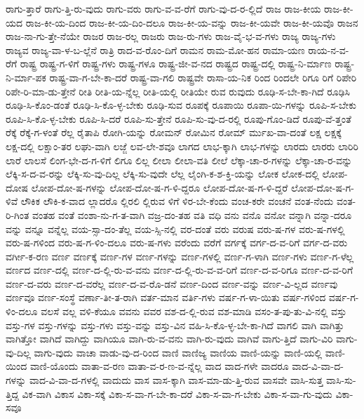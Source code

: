 {ರಾಗು-ತ್ತಾರೆ
ರಾಗು-ತ್ತಿ-ರು-ವುದು
ರಾಗು-ವರು
ರಾಗು-ವ-ವ-ರೆಗೆ
ರಾಗು-ವು-ದ-ರ-ಲ್ಲಿದೆ
ರಾಜ
ರಾಜ-ಕೀಯ
ರಾಜ-ಕೀ-ಯದ
ರಾಜ-ಕೀ-ಯ-ದಿಂದ
ರಾಜ-ಕೀ-ಯ-ದಿಂ-ದಲೂ
ರಾಜ-ಕೀ-ಯ-ವನ್ನು
ರಾಜ-ಕೀ-ಯವೇ
ರಾಜ-ಕೀ-ಯವೊ
ರಾಜನ
ರಾಜ-ನಾ-ಗು-ತ್ತೇ-ನೆಯೇ
ರಾಜರ
ರಾಜ-ರಲ್ಲ
ರಾಜರು
ರಾಜ-ರು-ಗಳು
ರಾಜ-ವೈ-ಭ-ವ-ಗಳು
ರಾಜ್ಯ
ರಾಜ್ಯ-ಗಳು
ರಾಜ್ಯವ
ರಾಜ್ಯ-ವಾ-ಳ-ಬ-ಲ್ಲೆನೆ
ರಾತ್ರಿ
ರಾದ-ವ-ರೊಂ-ದಿಗೆ
ರಾಮನ
ರಾಮ-ಮೋ-ಹನ
ರಾಮಾ-ಯಣ
ರಾಯ-ನ-ವ-ರೆಗೆ
ರಾಷ್ಟ್ರ
ರಾಷ್ಟ್ರ-ಗ-ಳಿಗೆ
ರಾಷ್ಟ್ರ-ಗಳು
ರಾಷ್ಟ್ರ-ಗಳೂ
ರಾಷ್ಟ್ರ-ಜೀ-ವ-ನದ
ರಾಷ್ಟ್ರದ
ರಾಷ್ಟ್ರ-ದಲ್ಲಿ
ರಾಷ್ಟ್ರ-ನಿ-ರ್ಮಾಣ
ರಾಷ್ಟ್ರ-ನಿ-ರ್ಮಾ-ಪಕ
ರಾಷ್ಟ್ರ-ವಾ-ಗ-ಬೇ-ಕಾ-ದರೆ
ರಾಷ್ಟ್ರ-ವಾ-ಗಲಿ
ರಾಷ್ಟ್ರವೇ
ರಾಸಾ-ಯ-ನಿಕ
ರಿಂದ
ರಿಂದಲೇ
ರಿಗೂ
ರಿಗೆ
ರಿಪೇರಿ
ರಿಪೇ-ರಿ-ಮಾ-ಡು-ತ್ತೇನೆ
ರೀತಿ
ರೀತಿ-ಯ-ನ್ನೆಲ್ಲ
ರೀತಿ-ಯಲ್ಲಿ
ರೀತಿಯೇ
ರುವ
ರುವುದು
ರೂಢಿ-ಸ-ಬೇ-ಕಾ-ಗಿದೆ
ರೂಢಿಸಿ
ರೂಢಿ-ಸಿ-ಕೊಂ-ಡಂತೆ
ರೂಢಿ-ಸಿ-ಕೊ-ಳ್ಳ-ಬೇಕು
ರೂಢಿ-ಸುವ
ರೂಪಕ್ಕೆ
ರೂಪಾಯಿ
ರೂಪಾ-ಯಿ-ಗಳನ್ನು
ರೂಪಿ-ಸ-ಬೇಕು
ರೂಪಿ-ಸಿ-ಕೊ-ಳ್ಳ-ಬೇಕು
ರೂಪಿ-ಸಿ-ದರೆ
ರೂಪಿ-ಸು-ತ್ತೇನೆ
ರೂಪಿ-ಸು-ವು-ದ-ರಲ್ಲಿ
ರೂಪು-ಗೊಂ-ಡಿದೆ
ರೂಪು-ವೆ-ತ್ತಂತೆ
ರೆಕ್ಕೆ
ರೆಕ್ಕೆ-ಗ-ಳಂತೆ
ರೆಲ್ಲ
ರೈತಾಪಿ
ರೋಗಿ-ಯನ್ನು
ರೋಮನ್
ರೋಮಿನ
ರೋಮ್
ರ್ಮುಖ-ವಾ-ದಂತೆ
ಲಕ್ಷ
ಲಕ್ಷಕ್ಕೆ
ಲಕ್ಷ-ದಲ್ಲಿ
ಲಕ್ಷಾಂ-ತರ
ಲಘು-ವಾಗಿ
ಲಜ್ಜೆ
ಲವ-ಲೇ-ಶವೂ
ಲಾಗದ
ಲಾಭ-ಕ್ಕಾಗಿ
ಲಾಭ-ಗಳನ್ನು
ಲಾರದು
ಲಾರರು
ಲಾರಿರಿ
ಲಾರೆ
ಲಾಲಸೆ
ಲಿಂಗ-ಭೇ-ದ-ಗ-ಳಿಗೆ
ಲಿಗೂ
ಲಿಲ್ಲ
ಲೀಲಾ
ಲೀಲಾ-ವತಿ
ಲೀಲೆ
ಲೆಕ್ಕಾ-ಚಾ-ರ-ಗಳನ್ನು
ಲೆಕ್ಕಾ-ಚಾ-ರ-ವನ್ನು
ಲೆಕ್ಕಿ-ಸ-ದ-ವ-ರನ್ನು
ಲೆಕ್ಕಿ-ಸು-ವು-ದಿಲ್ಲ
ಲೆಕ್ಕಿ-ಸು-ವುದೇ
ಲೆಲ್ಲ
ಲೈಂಗಿ-ಕ-ಶ-ಕ್ತಿ-ಯನ್ನು
ಲೋಕ
ಲೋಕ-ದಲ್ಲಿ
ಲೋಪ-ದೋಷ
ಲೋಪ-ದೋ-ಷ-ಗಳನ್ನು
ಲೋಪ-ದೋ-ಷ-ಗ-ಳಿ-ದ್ದರೂ
ಲೋಪ-ದೋ-ಷ-ಗ-ಳಿ-ದ್ದರೆ
ಲೋಪ-ದೋ-ಷ-ಗ-ಳಿವೆ
ಲೌಕಿಕ
ಲೌಕಿ-ಕ-ವಾದ
ಲ್ಲಾದರೊ
ಲ್ಲಿರಲಿ
ಲ್ಲಿರುವ
ಳಿಗೆ
ಳಿರ-ಬೇ-ಕೆಂದು
ವಂಚ-ಕರೇ
ವಂಚನೆ
ವಂತ-ನೆಂದು
ವಂತ-ರಿ-ಗಿಂತ
ವಂತಹ
ವಂತೆ
ವಂಶಾ-ನು-ಗ-ತ-ವಾಗಿ
ವಜ್ರ-ದಂ-ತಹ
ವತಿ
ವಧಿ
ವನು
ವನೊ
ವನೋ
ವನ್ನಾಗಿ
ವನ್ನಾ-ದರೂ
ವನ್ನು
ವನ್ನೂ
ವನ್ನೆಲ್ಲ
ವಯ-ಸ್ಸಾ-ದಂ-ತೆಲ್ಲ
ವಯ-ಸ್ಸಿ-ನಲ್ಲಿ
ವರ-ದಂತೆ
ವರು
ವರುಷ
ವರು-ಷ-ಗಳ
ವರು-ಷ-ಗಳಲ್ಲಿ
ವರು-ಷ-ಗಳಿಂದ
ವರು-ಷ-ಗ-ಳಿಂ-ದಲೂ
ವರು-ಷ-ಗಳು
ವರೆಂದು
ವರೆಗೆ
ವರ್ಗಕ್ಕೆ
ವರ್ಗ-ದ-ವ-ರಿಗೆ
ವರ್ಗ-ದ-ವರು
ವರ್ಗೀ-ಕ-ರಣ
ವರ್ಣ
ವರ್ಣಕ್ಕೆ
ವರ್ಣ-ಗಳ
ವರ್ಣ-ಗಳನ್ನು
ವರ್ಣ-ಗಳಲ್ಲಿ
ವರ್ಣ-ಗ-ಳಾಗಿ
ವರ್ಣ-ಗಳು
ವರ್ಣ-ಗ-ಳೆಲ್ಲ
ವರ್ಣದ
ವರ್ಣ-ದಲ್ಲಿ
ವರ್ಣ-ದ-ಲ್ಲಿ-ರು-ವ-ವನು
ವರ್ಣ-ದ-ಲ್ಲಿ-ರು-ವ-ವ-ರಿಗೆ
ವರ್ಣ-ದ-ವ-ರಿಗೂ
ವರ್ಣ-ದ-ವ-ರಿಗೆ
ವರ್ಣ-ದ-ವರು
ವರ್ಣ-ದ-ವರೆಲ್ಲ
ವರ್ಣ-ದ-ವ-ರೊ-ಡನೆ
ವರ್ಣ-ದಿಂದ
ವರ್ಣ-ವನ್ನು
ವರ್ಣ-ವಿ-ಲ್ಲದ
ವರ್ಣವು
ವರ್ಣವೂ
ವರ್ಣ-ಸಂಸ್ಥೆ
ವರ್ಣಾ-ತೀ-ತ-ರಾಗಿ
ವರ್ತ-ಮಾನ
ವರ್ತಿ-ಗಳು
ವರ್ಷ-ಗ-ಳಾ-ಯಿತು
ವರ್ಷ-ಗಳಿಂದ
ವರ್ಷ-ಗ-ಳಿಂ-ದಲೂ
ವಲಸೆ
ವಲ್ಲ
ವಳಿ-ಕೆಯೂ
ವವನು
ವವರ
ವಶ-ದ-ಲ್ಲಿ-ರುವ
ವಶ-ಮಾಡಿ
ವಸಂ-ತ-ಪು-ತು-ವಿ-ನಲ್ಲಿ
ವಸ್ತು
ವಸ್ತು-ಗಳ
ವಸ್ತು-ಗಳನ್ನು
ವಸ್ತು-ಗಳು
ವಸ್ತು-ವನ್ನು
ವಸ್ತು-ವಿನ
ವಹಿ-ಸಿ-ಕೊ-ಳ್ಳ-ಬೇ-ಕಾ-ಗಿದೆ
ವಾಗಲಿ
ವಾಗಿ
ವಾಗಿತ್ತು
ವಾಗಿತ್ತೋ
ವಾಗಿದೆ
ವಾಗಿದ್ದು
ವಾಗಿಯೂ
ವಾಗಿ-ರು-ವ-ವನು
ವಾಗಿ-ರು-ವುದು
ವಾಗಿವೆ
ವಾಗು-ತ್ತಿದೆ
ವಾಗು-ವಿರಿ
ವಾಗು-ವು-ದಿಲ್ಲ
ವಾಗು-ವುದು
ವಾಚಾ
ವಾಡು-ವು-ದ-ರಿಂದ
ವಾಣಿ
ವಾಣಿಜ್ಯ
ವಾಣಿಯ
ವಾಣಿ-ಯನ್ನು
ವಾಣಿ-ಯಲ್ಲಿ
ವಾಣಿ-ಯಿಂದ
ವಾಣಿ-ಯೊಂದು
ವಾತಾ-ವ-ರಣ
ವಾತಾ-ವ-ರ-ಣ-ವ-ನ್ನೆಲ್ಲ
ವಾದ
ವಾದ-ಗಳೇ
ವಾದರೂ
ವಾದ-ವಿ-ವಾ-ದ-ಗಳನ್ನು
ವಾದ-ವಿ-ವಾ-ದ-ಗಳಲ್ಲಿ
ವಾದುದು
ವಾಸ
ವಾಸ-ಕ್ಕಾಗಿ
ವಾಸ-ಮಾ-ಡು-ತ್ತಿ-ರುವ
ವಾಸವೇ
ವಾಸಿ-ಸುತ್ತ
ವಾಸಿ-ಸು-ತ್ತಿದ್ದ
ವಿಕ-ವಾಗಿ
ವಿಕಾಸ
ವಿಕಾ-ಸಕ್ಕೆ
ವಿಕಾ-ಸ-ವಾ-ಗ-ಬೇ-ಕಾ-ದರೆ
ವಿಕಾ-ಸ-ವಾ-ಗ-ಬೇಕು
ವಿಕಾ-ಸ-ವಾ-ಗು-ವುದು
ವಿಕಾ-ಸವೂ
}
